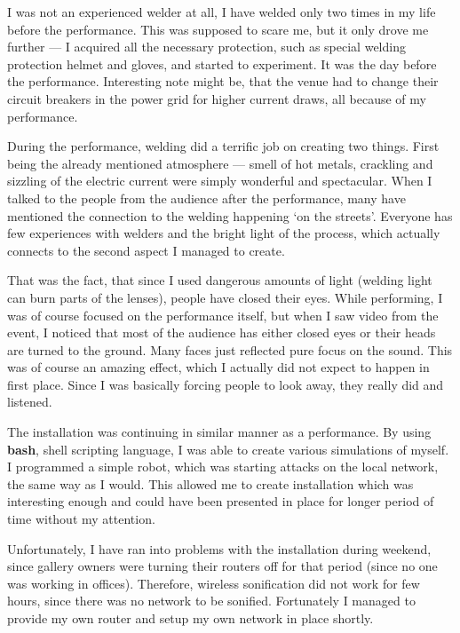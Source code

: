 \documentclass[12pt,a4paper,oneside]{report}
\begin{document}
I was not an experienced welder at all, I have welded only two times in my life before the performance. This was supposed to scare me, but it only drove me further --- I acquired all the necessary protection, such as special welding protection helmet and gloves, and started to experiment. It was the day before the performance. Interesting note might be, that the venue had to change their circuit breakers in the power grid for higher current draws, all because of my performance.

During the performance, welding did a terrific job on creating two things. First being the already mentioned atmosphere --- smell of hot metals, crackling and sizzling of the electric current were simply wonderful and spectacular. When I talked to the people from the audience after the performance, many have mentioned the connection to the welding happening `on the streets'. Everyone has few experiences with welders and the bright light of the process, which actually connects to the second aspect I managed to create. 

That was the fact, that since I used dangerous amounts of light (welding light can burn parts of the lenses), people have closed their eyes. While performing, I was of course focused on the performance itself, but when I saw video from the event, I noticed that most of the audience has either closed eyes or their heads are turned to the ground. Many faces just reflected pure focus on the sound. This was of course an amazing effect, which I actually did not expect to happen in first place. Since I was basically forcing people to look away, they really did and listened.

The installation was continuing in similar manner as a performance. By using \textbf{bash}, shell scripting language, I was able to create various simulations of myself. I programmed a simple robot, which was starting attacks on the local network, the same way as I would. This allowed me to create installation which was interesting enough and could have been presented in place for longer period of time without my attention.

Unfortunately, I have ran into problems with the installation during weekend, since gallery owners were turning their routers off for that period (since no one was working in offices). Therefore, wireless sonification did not work for few hours, since there was no network to be sonified. Fortunately I managed to provide my own router and setup my own network in place shortly.
\end{document}
